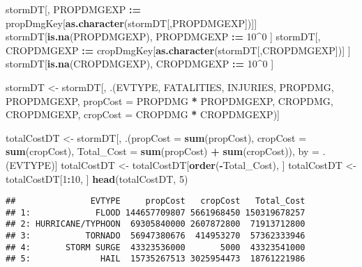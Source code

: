 \documentclass[]{article}
\newenvironment{Shaded}{\begin{snugshade}}{\end{snugshade}}
\newcommand{\KeywordTok}[1]{\textcolor[rgb]{0.13,0.29,0.53}{\textbf{#1}}}
\newcommand{\DataTypeTok}[1]{\textcolor[rgb]{0.13,0.29,0.53}{#1}}
\newcommand{\DecValTok}[1]{\textcolor[rgb]{0.00,0.00,0.81}{#1}}
\newcommand{\StringTok}[1]{\textcolor[rgb]{0.31,0.60,0.02}{#1}}
\newcommand{\OperatorTok}[1]{\textcolor[rgb]{0.81,0.36,0.00}{\textbf{#1}}}
\newcommand{\ErrorTok}[1]{\textcolor[rgb]{0.64,0.00,0.00}{\textbf{#1}}}
\newcommand{\NormalTok}[1]{#1}
\begin{document}
\begin{Shaded}
\begin{Highlighting}[]
\NormalTok{stormDT[, PROPDMGEXP }\OperatorTok{:}\ErrorTok{=}\StringTok{ }\NormalTok{propDmgKey[}\KeywordTok{as.character}\NormalTok{(stormDT[,PROPDMGEXP])]]}
\NormalTok{stormDT[}\KeywordTok{is.na}\NormalTok{(PROPDMGEXP), PROPDMGEXP }\OperatorTok{:}\ErrorTok{=}\StringTok{ }\DecValTok{10}\OperatorTok{^}\DecValTok{0}\NormalTok{ ]}
\NormalTok{stormDT[, CROPDMGEXP }\OperatorTok{:}\ErrorTok{=}\StringTok{ }\NormalTok{cropDmgKey[}\KeywordTok{as.character}\NormalTok{(stormDT[,CROPDMGEXP])] ]}
\NormalTok{stormDT[}\KeywordTok{is.na}\NormalTok{(CROPDMGEXP), CROPDMGEXP }\OperatorTok{:}\ErrorTok{=}\StringTok{ }\DecValTok{10}\OperatorTok{^}\DecValTok{0}\NormalTok{ ]}
\end{Highlighting}
\end{Shaded}

\begin{Shaded}
\begin{Highlighting}[]
\NormalTok{stormDT <-}\StringTok{ }\NormalTok{stormDT[, .(EVTYPE, FATALITIES, INJURIES, PROPDMG, PROPDMGEXP, }\DataTypeTok{propCost =}\NormalTok{ PROPDMG }\OperatorTok{*}\StringTok{ }\NormalTok{PROPDMGEXP, CROPDMG, CROPDMGEXP, }\DataTypeTok{cropCost =}\NormalTok{ CROPDMG }\OperatorTok{*}\StringTok{ }\NormalTok{CROPDMGEXP)]}
\end{Highlighting}
\end{Shaded}

\begin{Shaded}
\begin{Highlighting}[]
\NormalTok{totalCostDT <-}\StringTok{ }\NormalTok{stormDT[, .(}\DataTypeTok{propCost =} \KeywordTok{sum}\NormalTok{(propCost), }\DataTypeTok{cropCost =} \KeywordTok{sum}\NormalTok{(cropCost), }\DataTypeTok{Total_Cost =} \KeywordTok{sum}\NormalTok{(propCost) }\OperatorTok{+}\StringTok{ }\KeywordTok{sum}\NormalTok{(cropCost)), by =}\StringTok{ }\NormalTok{.(EVTYPE)]}
\NormalTok{totalCostDT <-}\StringTok{ }\NormalTok{totalCostDT[}\KeywordTok{order}\NormalTok{(}\OperatorTok{-}\NormalTok{Total_Cost), ]}
\NormalTok{totalCostDT <-}\StringTok{ }\NormalTok{totalCostDT[}\DecValTok{1}\OperatorTok{:}\DecValTok{10}\NormalTok{, ]}
\KeywordTok{head}\NormalTok{(totalCostDT, }\DecValTok{5}\NormalTok{)}
\end{Highlighting}
\end{Shaded}

\begin{verbatim}
##               EVTYPE     propCost   cropCost   Total_Cost
## 1:             FLOOD 144657709807 5661968450 150319678257
## 2: HURRICANE/TYPHOON  69305840000 2607872800  71913712800
## 3:           TORNADO  56947380676  414953270  57362333946
## 4:       STORM SURGE  43323536000       5000  43323541000
## 5:              HAIL  15735267513 3025954473  18761221986
\end{verbatim}
\end{document}
